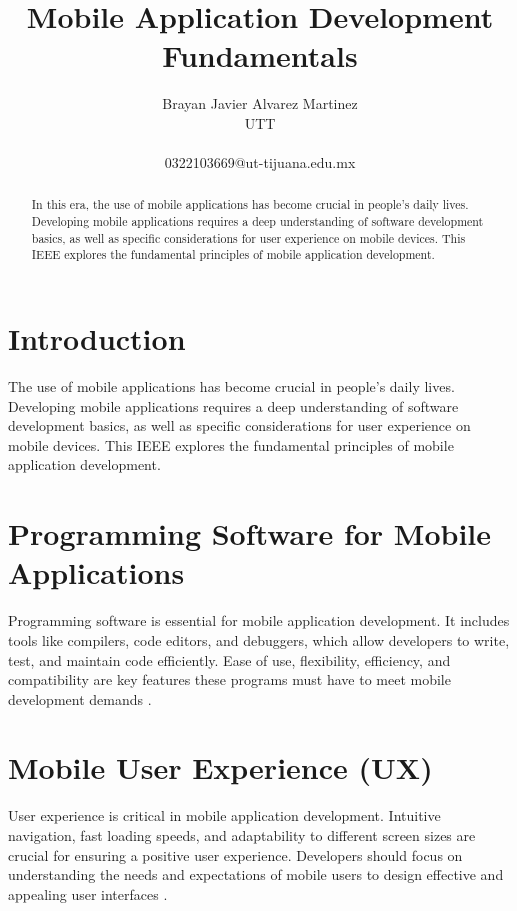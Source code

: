 \documentclass[journal]{IEEEtran}
\begin{document}
\title{Mobile Application Development Fundamentals}

\author{Brayan Javier Alvarez Martinez \\
UTT \\
\\0322103669@ut-tijuana.edu.mx}

\maketitle

\begin{abstract}
In this era, the use of mobile applications has become crucial in people's daily lives. Developing mobile applications requires a deep understanding of software development basics, as well as specific considerations for user experience on mobile devices. This IEEE explores the fundamental principles of mobile application development.
\end{abstract}

\section{Introduction}
The use of mobile applications has become crucial in people's daily lives. Developing mobile applications requires a deep understanding of software development basics, as well as specific considerations for user experience on mobile devices. This IEEE explores the fundamental principles of mobile application development.

\section{Programming Software for Mobile Applications}
Programming software is essential for mobile application development. It includes tools like compilers, code editors, and debuggers, which allow developers to write, test, and maintain code efficiently. Ease of use, flexibility, efficiency, and compatibility are key features these programs must have to meet mobile development demands \cite{software}.

\section{Mobile User Experience (UX)}
User experience is critical in mobile application development. Intuitive navigation, fast loading speeds, and adaptability to different screen sizes are crucial for ensuring a positive user experience. Developers should focus on understanding the needs and expectations of mobile users to design effective and appealing user interfaces \cite{ux}.
\end{document}
